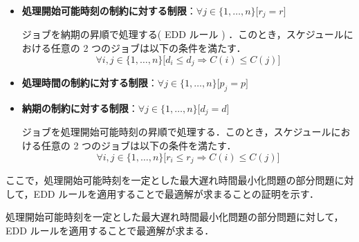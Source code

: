 \documentclass[12pt]{optlab-bachelor}
\begin{document}
\begin{itemize}
  \item \textbf{処理開始可能時刻の制約に対する制限}：$\forall j \in \{1,\ldots,n\}\big[ r_j = r \big]$

  ジョブを納期の昇順で処理する( EDD ルール ) ．このとき，スケジュールにおける任意の 2 つのジョブは以下の条件を満たす．
  \begin{displaymath}
    \forall i, j \in \{1,\ldots,n\}\big[d_i \le d_j \Rightarrow C(i) \le C(j)\big]
  \end{displaymath}
  \item \textbf{処理時間の制約に対する制限}：$\forall j \in \{1,\ldots,n\}\big[ p_j = p \big]$

  \item \textbf{納期の制約に対する制限}：$\forall j \in \{1,\ldots,n\}\big[ d_j = d \big]$

  ジョブを処理開始可能時刻の昇順で処理する．このとき，スケジュールにおける任意の 2 つのジョブは以下の条件を満たす．
  \begin{displaymath}
    \forall i, j \in \{1,\ldots,n\}\big[r_i \le r_j \Rightarrow C(i) \le C(j)\big]
  \end{displaymath}
\end{itemize}

ここで，処理開始可能時刻を一定とした最大遅れ時間最小化問題の部分問題に対して，EDD ルールを適用することで最適解が求まることの証明を示す．

\begin{lemma}\label{l_5}
  処理開始可能時刻を一定とした最大遅れ時間最小化問題の部分問題に対して，EDD ルールを適用することで最適解が求まる．
\end{lemma}
\end{document}
